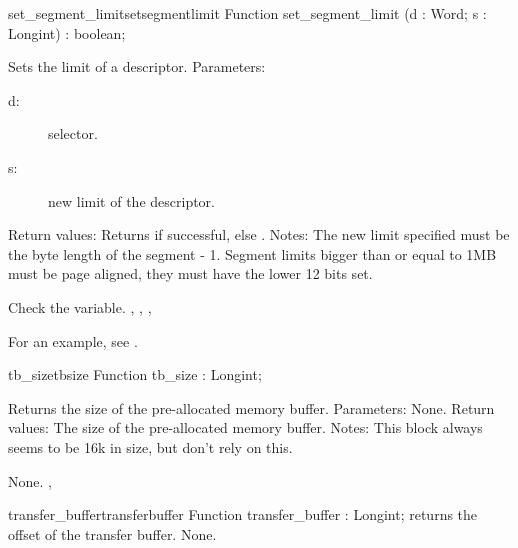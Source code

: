 \begin{functionl}{set\_segment\_limit}{setsegmentlimit}
\Declaration
Function set\_segment\_limit (d : Word; s : Longint) : boolean;

\Description
Sets the limit of a descriptor.
Parameters: 
\begin{description}
\item[d:\ ] selector.
\item[s:\ ] new limit of the descriptor.
\end{description}
Return values: Returns  if successful, else .
Notes: The new limit specified must be the byte length of the segment - 1.
Segment limits bigger than or equal to 1MB must be page aligned, they must
have the lower 12 bits set.

\Errors
 Check the  variable.
\SeeAlso
{},
,
, 

\end{functionl}
For an example, see 
.
\begin{functionl}{tb\_size}{tbsize}
\Declaration
Function tb\_size  : Longint;

\Description
Returns the size of the pre-allocated \dos memory buffer.
Parameters: None.
Return values: The size of the pre-allocated \dos memory buffer.
Notes:
This block always seems to be 16k in size, but don't rely on this.

\Errors
None.
\SeeAlso
{}, 
\end{functionl}

\begin{functionl}{transfer\_buffer}{transferbuffer}
\Declaration
Function transfer\_buffer : Longint;
\Description
{} returns the offset of the transfer buffer.
\Errors
None.
\SeeAlso
{}
\end{functionl}

